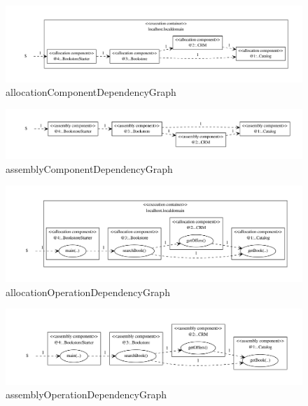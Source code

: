 	\begin{figure}[H]
		\centering
		\includegraphics[width=1.0\textwidth]{images/allocationComponentDependencyGraph}
		\caption{allocationComponentDependencyGraph}
	\end{figure}
	\begin{figure}[H]
		\centering
		\includegraphics[width=1.0\textwidth]{images/assemblyComponentDependencyGraph}
		\caption{assemblyComponentDependencyGraph}
	\end{figure}
	
	\begin{figure}[H]
		\centering
		\includegraphics[width=1.0\textwidth]{images/allocationOperationDependencyGraph}
		\caption{allocationOperationDependencyGraph}
	\end{figure}
	\begin{figure}[H]
		\centering
		\includegraphics[width=1.0\textwidth]{images/assemblyOperationDependencyGraph}
		\caption{assemblyOperationDependencyGraph}
	\end{figure}
	
